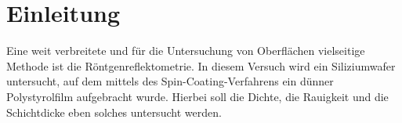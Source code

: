 \section{Einleitung}
Eine weit verbreitete und für die Untersuchung von Oberflächen vielseitige Methode ist die Röntgenreflektometrie. In diesem Versuch wird ein Siliziumwafer untersucht, auf dem mittels des Spin-Coating-Verfahrens ein dünner Polystyrolfilm aufgebracht wurde. Hierbei soll die Dichte, die Rauigkeit und die Schichtdicke eben solches untersucht werden.
